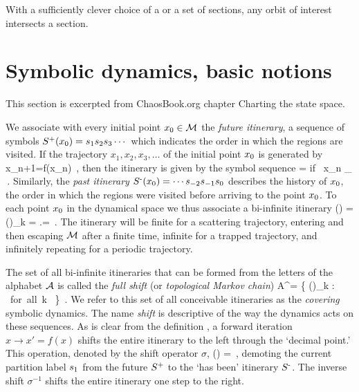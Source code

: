 With a sufficiently clever choice of a {\PoincSec} or a set of sections,
any orbit of interest intersects a section.

\section{Symbolic dynamics, basic notions}
\label{s-SymbDynDefs}

This section is excerpted from ChaosBook.org
chapter
{Charting the state space}.

We associate with every  initial point ${x_0} \in \mathcal{M}$
the {\em future itinerary},
a sequence of symbols
$S^\textrm{\scriptsize +}({x_0})={s_{1}} {s_{2}} {s_{3}} \cdots$
which indicates the order in which the regions are visited.
If the trajectory $x_1,  x_2,  x_3,  \ldots$
of the initial point ${x_0}$ is generated by
\beq
   x_{n+1}=f(x_n)
\,,
then the itinerary is given by the symbol sequence
\beq
    = \Ssym{} \qquad \mbox{if\ } \qquad  x_n \in \pS_{\Ssym{}}
 \,.
Similarly, the {\em past itinerary}
$\Spast(\xInit)=\cdots\Ssym{-2} \Ssym{-1} \Ssym{0} $
describes the history of $\xInit$, the order in which
the regions were visited before arriving to the point $\xInit$.
To each point $\xInit$ in the dynamical space we thus associate
a bi-infinite itinerary
\beq
\Sbiinf(\xInit) = ()_{k\in \integers}
        = \Spast.\Sfuture  =
\,.
\label{biifs}
\eeq
The itinerary will be finite for a scattering trajectory,
entering and then escaping $\mathcal{M}$ after a finite time,
infinite for a trapped trajectory,
and infinitely repeating for a periodic trajectory.

The set of all bi-infinite itineraries that can be formed from the
letters of the alphabet ${\cal A}$ is called the
{\em full shift} (or {\em topological Markov chain})
\beq
{\cal A}^\integers = \{ ()_{k\in \integers}
              :   \mbox{~for all k~} \in  \integers \}
\,.
We refer to this set of all conceivable itineraries
as the {\em covering} symbolic dynamics.
The name {\em shift} is descriptive of the way
the dynamics acts on these sequences.
As is clear from the definition ,
a forward iteration $x\rightarrow x' = f(x)$ shifts the
entire itinerary to the left through the `decimal point.'
This operation, denoted by the shift operator $\sigma$,
\beq
   \sigma()
     =  
\,,
\label{e-shift-s}
\eeq
demoting the current partition label ${s_{1}}$
from the future $S^\textrm{\scriptsize +}$ to the `has been' itinerary $S^\textrm{-}$.
The inverse shift $\sigma^{-1}$ shifts the entire itinerary one step
to the right.

